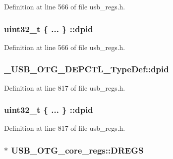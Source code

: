 Definition at line 566 of file usb\-\_\-regs.\-h.

\hypertarget{group___u_s_b___o_t_g___d_r_i_v_e_r_gac437003e56815b794977d96504285d2d}{
\subsubsection[{dpid}]{\setlength{\rightskip}{0pt plus 5cm}uint32\-\_\-t \{ ... \} \-::dpid}}\label{group___u_s_b___o_t_g___d_r_i_v_e_r_gac437003e56815b794977d96504285d2d}


Definition at line 566 of file usb\-\_\-regs.\-h.

\hypertarget{group___u_s_b___o_t_g___d_r_i_v_e_r_gac4b8b9dfdf722dd3e1fed849bf8ea7ba}{
\subsubsection[{dpid}]{ \-\_\-\-U\-S\-B\-\_\-\-O\-T\-G\-\_\-\-D\-E\-P\-C\-T\-L\-\_\-\-Type\-Def\-::dpid}}\label{group___u_s_b___o_t_g___d_r_i_v_e_r_gac4b8b9dfdf722dd3e1fed849bf8ea7ba}


Definition at line 817 of file usb\-\_\-regs.\-h.

\hypertarget{group___u_s_b___o_t_g___d_r_i_v_e_r_gaebb8df8a97f633ec77504d801b07b4d7}{
\subsubsection[{dpid}]{\setlength{\rightskip}{0pt plus 5cm}uint32\-\_\-t \{ ... \} \-::dpid}}\label{group___u_s_b___o_t_g___d_r_i_v_e_r_gaebb8df8a97f633ec77504d801b07b4d7}


Definition at line 817 of file usb\-\_\-regs.\-h.

\hypertarget{group___u_s_b___o_t_g___d_r_i_v_e_r_ga35f5af507074b23c0c181f6f7a6a7c19}{
\subsubsection[{D\-R\-E\-G\-S}]{$\ast$ U\-S\-B\-\_\-\-O\-T\-G\-\_\-core\-\_\-regs\-::\-D\-R\-E\-G\-S}}\label{group___u_s_b___o_t_g___d_r_i_v_e_r_ga35f5af507074b23c0c181f6f7a6a7c19}



